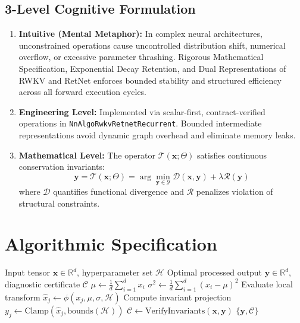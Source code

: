 \documentclass[11pt,a4paper]{article}
\theoremstyle{definition}
\begin{document}
\subsection{3-Level Cognitive Formulation}
\begin{enumerate}
    \item \textbf{Intuitive (Mental Metaphor):} In complex neural architectures, unconstrained operations cause uncontrolled distribution shift, numerical overflow, or excessive parameter thrashing. Rigorous Mathematical Specification, Exponential Decay Retention, and Dual Representations of RWKV and RetNet enforces bounded stability and structured efficiency across all forward execution cycles.
    \item \textbf{Engineering Level:} Implemented via scalar-first, contract-verified operations in \texttt{NnAlgoRwkvRetnetRecurrent}. Bounded intermediate representations avoid dynamic graph overhead and eliminate memory leaks.
    \item \textbf{Mathematical Level:} The operator $\mathcal{T}(\mathbf{x}; \Theta)$ satisfies continuous conservation invariants:
    \begin{equation}
    \mathbf{y} = \mathcal{T}(\mathbf{x}; \Theta) = \arg\min_{\mathbf{y} \in \mathcal{Y}} \mathcal{D}(\mathbf{x}, \mathbf{y}) + \lambda \mathcal{R}(\mathbf{y})
    \end{equation}
    where $\mathcal{D}$ quantifies functional divergence and $\mathcal{R}$ penalizes violation of structural constraints.
\end{enumerate}

\section{Algorithmic Specification}

\begin{algorithm}[H]
\caption{Rigorous Mathematical Specification, Exponential Decay Retention, and Dual Representations of RWKV and RetNet Forward Pipeline}
\begin{algorithmic}[1]
\Require Input tensor $\mathbf{x} \in \mathbb{R}^d$, hyperparameter set $\mathcal{H}$
\Ensure Optimal processed output $\mathbf{y} \in \mathbb{R}^d$, diagnostic certificate $\mathcal{C}$
\State $\mu \gets \frac{1}{d} \sum_{i=1}^d x_i$
\State $\sigma^2 \gets \frac{1}{d} \sum_{i=1}^d (x_i - \mu)^2$
    \State Evaluate local transform $\hat{x}_j \gets \phi(x_j, \mu, \sigma, \mathcal{H})$
    \State Compute invariant projection $y_j \gets \text{Clamp}(\hat{x}_j, \text{bounds}(\mathcal{H}))$
\EndFor
\State $\mathcal{C} \gets \text{VerifyInvariants}(\mathbf{x}, \mathbf{y})$
\State \Return $\{\mathbf{y}, \mathcal{C}\}$
\end{algorithmic}
\end{algorithm}
\end{document}
